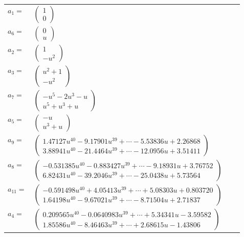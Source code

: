 \documentclass[1p]{elsarticle_modified}
\theoremstyle{definition}
\begin{document}
\begin{tabular}{m{7pt} m{180pt} m{7pt} m{180pt} }
\flushright $a_{1}=$&$\begin{pmatrix}1\\0\end{pmatrix}$ \\
\flushright $a_{6}=$&$\begin{pmatrix}0\\u\end{pmatrix}$ \\
\flushright $a_{2}=$&$\begin{pmatrix}1\\- u^2\end{pmatrix}$ \\
\flushright $a_{3}=$&$\begin{pmatrix}u^2+1\\- u^2\end{pmatrix}$ \\
\flushright $a_{7}=$&$\begin{pmatrix}- u^5-2 u^3- u\\u^5+u^3+u\end{pmatrix}$ \\
\flushright $a_{5}=$&$\begin{pmatrix}- u\\u^3+u\end{pmatrix}$ \\
\flushright $a_{9}=$&$\begin{pmatrix}1.47127 u^{40}-9.17901 u^{39}+\cdots-5.53836 u+2.26868\\3.88941 u^{40}-21.4464 u^{39}+\cdots-12.0956 u+3.51411\end{pmatrix}$ \\
\flushright $a_{8}=$&$\begin{pmatrix}-0.531385 u^{40}-0.883427 u^{39}+\cdots-9.18931 u+3.76752\\6.82431 u^{40}-39.2046 u^{39}+\cdots-25.0438 u+5.73564\end{pmatrix}$ \\
\flushright $a_{11}=$&$\begin{pmatrix}-0.591498 u^{40}+4.05413 u^{39}+\cdots+5.08303 u+0.803720\\1.64198 u^{40}-9.67021 u^{39}+\cdots-8.71504 u+2.71837\end{pmatrix}$ \\
\flushright $a_{4}=$&$\begin{pmatrix}0.209565 u^{40}-0.0640983 u^{39}+\cdots+5.34341 u-3.59582\\1.85586 u^{40}-8.46463 u^{39}+\cdots+2.68615 u-1.43806\end{pmatrix}$ \\

\end{tabular}
\end{document}
